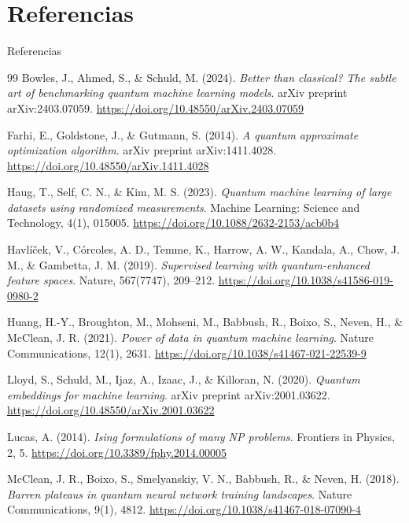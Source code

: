 \documentclass[aspectratio=169,10pt,professionalfonts]{beamer}
\begin{document}
\section{Referencias}

\begin{frame}[allowframebreaks]{Referencias}
\scriptsize
\begin{thebibliography}{99}
	Bowles, J., Ahmed, S., \& Schuld, M. (2024).
	\emph{Better than classical? The subtle art of benchmarking quantum machine learning models}.
	arXiv preprint arXiv:2403.07059.
	\url{https://doi.org/10.48550/arXiv.2403.07059}

	Farhi, E., Goldstone, J., \& Gutmann, S. (2014).
	\emph{A quantum approximate optimization algorithm}.
	arXiv preprint arXiv:1411.4028.
	\url{https://doi.org/10.48550/arXiv.1411.4028}

	Haug, T., Self, C. N., \& Kim, M. S. (2023).
	\emph{Quantum machine learning of large datasets using randomized measurements}.
	Machine Learning: Science and Technology, 4(1), 015005.
	\url{https://doi.org/10.1088/2632-2153/acb0b4}

	Havlíček, V., Córcoles, A. D., Temme, K., Harrow, A. W., Kandala, A., Chow, J. M., \& Gambetta, J. M. (2019).
	\emph{Supervised learning with quantum-enhanced feature spaces}.
	Nature, 567(7747), 209--212.
	\url{https://doi.org/10.1038/s41586-019-0980-2}

	Huang, H.-Y., Broughton, M., Mohseni, M., Babbush, R., Boixo, S., Neven, H., \& McClean, J. R. (2021).
	\emph{Power of data in quantum machine learning}.
	Nature Communications, 12(1), 2631.
	\url{https://doi.org/10.1038/s41467-021-22539-9}

	Lloyd, S., Schuld, M., Ijaz, A., Izaac, J., \& Killoran, N. (2020).
	\emph{Quantum embeddings for machine learning}.
	arXiv preprint arXiv:2001.03622.
	\url{https://doi.org/10.48550/arXiv.2001.03622}

	Lucas, A. (2014).
	\emph{Ising formulations of many NP problems}.
	Frontiers in Physics, 2, 5.
	\url{https://doi.org/10.3389/fphy.2014.00005}

	McClean, J. R., Boixo, S., Smelyanskiy, V. N., Babbush, R., \& Neven, H. (2018).
	\emph{Barren plateaus in quantum neural network training landscapes}.
	Nature Communications, 9(1), 4812.
	\url{https://doi.org/10.1038/s41467-018-07090-4}


\end{thebibliography}
\end{frame}
\end{document}
